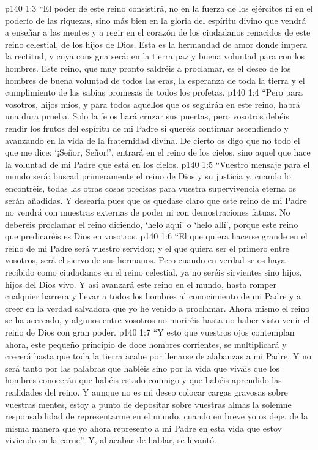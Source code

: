 \vs p140 1:3 “El poder de este reino consistirá, no en la fuerza de los ejércitos ni en el poderío de las riquezas, sino más bien en la gloria del espíritu divino que vendrá a enseñar a las mentes y a regir en el corazón de los ciudadanos renacidos de este reino celestial, de los hijos de Dios. Esta es la hermandad de amor donde impera la rectitud, y cuya consigna será: en la tierra paz y buena voluntad para con los hombres. Este reino, que muy pronto saldréis a proclamar, es el deseo de los hombres de buena voluntad de todos las eras, la esperanza de toda la tierra y el cumplimiento de las sabias promesas de todos los profetas.
\vs p140 1:4 “Pero para vosotros, hijos míos, y para todos aquellos que os seguirán en este reino, habrá una dura prueba. Solo la fe os hará cruzar sus puertas, pero vosotros debéis rendir los frutos del espíritu de mi Padre si queréis continuar ascendiendo y avanzando en la vida de la fraternidad divina. De cierto os digo que no todo el que me dice: ‘¡Señor, Señor!’, entrará en el reino de los cielos, sino aquel que hace la voluntad de mi Padre que está en los cielos.
\vs p140 1:5 “Vuestro mensaje para el mundo será: buscad primeramente el reino de Dios y su justicia y, cuando lo encontréis, todas las otras cosas precisas para vuestra supervivencia eterna os serán añadidas. Y desearía pues que os quedase claro que este reino de mi Padre no vendrá con muestras externas de poder ni con demostraciones fatuas. No deberéis proclamar el reino diciendo, ‘helo aquí’ o ‘helo allí’, porque este reino que predicaréis es Dios en vosotros.
\vs p140 1:6 “El que quiera hacerse grande en el reino de mi Padre será vuestro servidor; y el que quiera ser el primero entre vosotros, será el siervo de sus hermanos. Pero cuando en verdad se os haya recibido como ciudadanos en el reino celestial, ya no seréis sirvientes sino hijos, hijos del Dios vivo. Y así avanzará este reino en el mundo, hasta romper cualquier barrera y llevar a todos los hombres al conocimiento de mi Padre y a creer en la verdad salvadora que yo he venido a proclamar. Ahora mismo el reino se ha acercado, y algunos entre vosotros no moriréis hasta no haber visto venir el reino de Dios con gran poder.
\vs p140 1:7 “Y esto que vuestros ojos contemplan ahora, este pequeño principio de doce hombres corrientes, se multiplicará y crecerá hasta que toda la tierra acabe por llenarse de alabanzas a mi Padre. Y no será tanto por las palabras que habléis sino por la vida que viváis que los hombres conocerán que habéis estado conmigo y que habéis aprendido las realidades del reino. Y aunque no es mi deseo colocar cargas gravosas sobre vuestras mentes, estoy a punto de depositar sobre vuestras almas la solemne responsabilidad de representarme en el mundo, cuando en breve yo os deje, de la misma manera que yo ahora represento a mi Padre en esta vida que estoy viviendo en la carne”. Y, al acabar de hablar, se levantó.
